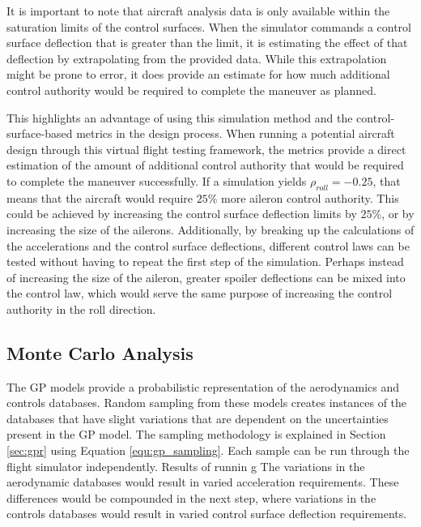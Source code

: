 It is important to note that aircraft analysis data is only available within the saturation limits of the control surfaces. 
When the simulator commands a control surface deflection that is greater than the limit, it is estimating the effect of that deflection by extrapolating from the provided data. 
While this extrapolation might be prone to error, it does provide an estimate for how much additional control authority would be required to complete the maneuver as planned. 

This highlights an advantage of using this simulation method and the control-surface-based metrics in the design process. 
When running a potential aircraft design through this virtual flight testing framework, the metrics provide a direct estimation of the amount of additional control authority that would be required to complete the maneuver successfully. 
If a simulation yields $\rho_{roll} = -0.25$, that means that the aircraft would require $25\%$ more aileron control authority. 
This could be achieved by increasing the control surface deflection limits by $25\%$, or by increasing the size of the ailerons. 
Additionally, by breaking up the calculations of the accelerations and the control surface deflections, different control laws can be tested without having to repeat the first step of the simulation. 
Perhaps instead of increasing the size of the aileron, greater spoiler deflections can be mixed into the control law, which would serve the same purpose of increasing the control authority in the roll direction. 

\subsection{Monte Carlo Analysis}

The GP models provide a probabilistic representation of the aerodynamics and controls databases. 
Random sampling from these models creates instances of the databases that have slight variations that are dependent on the uncertainties present in the GP model.
The sampling methodology is explained in Section \ref{sec:gpr} using Equation \ref{equ:gp_sampling}.
Each sample can be run through the flight simulator independently.
Results of runnin g
The variations in the aerodynamic databases would result in varied acceleration requirements.
These differences would be compounded in the next step, where variations in the controls databases would result in varied control surface deflection requirements. 

